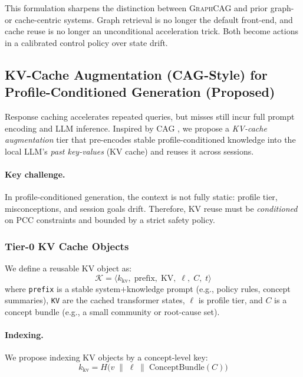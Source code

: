 \documentclass[11pt,a4paper,twocolumn]{article}
\newcommand{\graphcag}{\textsc{GraphCAG}}
\begin{document}
This formulation sharpens the distinction between \graphcag{} and prior graph- or cache-centric systems. Graph retrieval is no longer the default front-end, and cache reuse is no longer an unconditional acceleration trick. Both become actions in a calibrated control policy over state drift.

\subsection{KV-Cache Augmentation (CAG-Style) for Profile-Conditioned Generation (Proposed)}
\label{sec:kvcache}

Response caching accelerates repeated queries, but misses still incur full prompt encoding and LLM inference. Inspired by CAG \cite{chan2024cag}, we propose a \emph{KV-cache augmentation} tier that pre-encodes stable profile-conditioned knowledge into the local LLM's \emph{past key-values} (KV cache) and reuses it across sessions.

\paragraph{Key challenge.} In profile-conditioned generation, the context is not fully static: profile tier, misconceptions, and session goals drift. Therefore, KV reuse must be \emph{conditioned} on PCC constraints and bounded by a strict safety policy.

\subsubsection{Tier-0 KV Cache Objects}

We define a reusable KV object as:
\begin{equation}
\label{eq:kv_object}
\mathcal{K} = \langle k_{\text{kv}},\; \text{prefix},\; \text{KV},\; \ell,\; C,\; t \rangle
\end{equation}
where \texttt{prefix} is a stable system+knowledge prompt (e.g., policy rules, concept summaries), \texttt{KV} are the cached transformer states, $\ell$ is profile tier, and $C$ is a concept bundle (e.g., a small community or root-cause set).

\paragraph{Indexing.} We propose indexing KV objects by a concept-level key:
\begin{equation}
k_{\text{kv}} = H\big(v \;\|\; \ell \;\|\; \text{ConceptBundle}(C)\big)
\end{equation}
\end{document}
